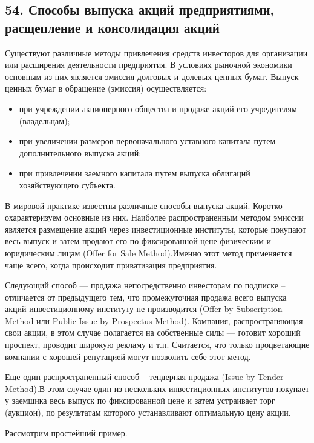 \subsection*{54. Способы выпуска акций предприятиями, расщепление и консолидация акций}

Существуют различные методы привлечения средств инвесторов для организации или расширения деятельности предприятия. В условиях рыночной экономики основным из них является эмиссия долговых и долевых ценных бумаг. Выпуск ценных бумаг в обращение (эмиссия) осуществляется: 
\begin{itemize}
	\item при учреждении акционерного общества и продаже акций его учредителям (владельцам); 
\item при увеличении размеров первоначального уставного капитала путем дополнительного выпуска акций; 
\item при привлечении заемного капитала путем выпуска облигаций хозяйствующего субъекта. 
\end{itemize}

В мировой практике известны различные способы выпуска акций. Коротко охарактеризуем основные из них. 
Наиболее распространенным методом эмиссии является размещение акций через инвестиционные институты, которые покупают весь выпуск и затем продают его по фиксированной цене физическим и юридическим лицам (Offer for Sale Method).Именно этот метод применяется чаще всего, когда происходит приватизация предприятия. 

Следующий способ --- продажа непосредственно инвесторам по подписке – отличается от предыдущего тем, что промежуточная продажа всего выпуска акций инвестиционному институту не производится (Offer by Subscription Method или Public Issue by Prospectus Method). Компания, распространяющая свои акции, в этом случае полагается на собственные силы --- готовит хороший проспект, проводит широкую рекламу и т.п. Считается, что только процветающие компании с хорошей репутацией могут позволить себе этот метод. 

Еще один распространенный способ – тендерная продажа (Issue by Tender Method).В этом случае один из нескольких инвестиционных институтов покупает у заемщика весь выпуск по фиксированной цене и затем устраивает торг (аукцион), по результатам которого устанавливают оптимальную цену акции. 

Рассмотрим простейший пример. 

